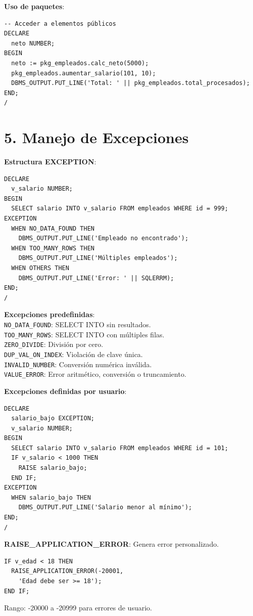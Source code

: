 \documentclass[8pt,a4paper,twocolumn]{article}
\begin{document}
\textbf{Uso de paquetes}:
\begin{lstlisting}
-- Acceder a elementos públicos
DECLARE
  neto NUMBER;
BEGIN
  neto := pkg_empleados.calc_neto(5000);
  pkg_empleados.aumentar_salario(101, 10);
  DBMS_OUTPUT.PUT_LINE('Total: ' || pkg_empleados.total_procesados);
END;
/
\end{lstlisting}

\section*{5. Manejo de Excepciones}

\textbf{Estructura EXCEPTION}:
\begin{lstlisting}
DECLARE
  v_salario NUMBER;
BEGIN
  SELECT salario INTO v_salario FROM empleados WHERE id = 999;
EXCEPTION
  WHEN NO_DATA_FOUND THEN
    DBMS_OUTPUT.PUT_LINE('Empleado no encontrado');
  WHEN TOO_MANY_ROWS THEN
    DBMS_OUTPUT.PUT_LINE('Múltiples empleados');
  WHEN OTHERS THEN
    DBMS_OUTPUT.PUT_LINE('Error: ' || SQLERRM);
END;
/
\end{lstlisting}

\textbf{Excepciones predefinidas}:\\
\texttt{NO\_DATA\_FOUND}: SELECT INTO sin resultados.\\
\texttt{TOO\_MANY\_ROWS}: SELECT INTO con múltiples filas.\\
\texttt{ZERO\_DIVIDE}: División por cero.\\
\texttt{DUP\_VAL\_ON\_INDEX}: Violación de clave única.\\
\texttt{INVALID\_NUMBER}: Conversión numérica inválida.\\
\texttt{VALUE\_ERROR}: Error aritmético, conversión o truncamiento.

\textbf{Excepciones definidas por usuario}:
\begin{lstlisting}
DECLARE
  salario_bajo EXCEPTION;
  v_salario NUMBER;
BEGIN
  SELECT salario INTO v_salario FROM empleados WHERE id = 101;
  IF v_salario < 1000 THEN
    RAISE salario_bajo;
  END IF;
EXCEPTION
  WHEN salario_bajo THEN
    DBMS_OUTPUT.PUT_LINE('Salario menor al mínimo');
END;
/
\end{lstlisting}

\textbf{RAISE\_APPLICATION\_ERROR}: Genera error personalizado.
\begin{lstlisting}
IF v_edad < 18 THEN
  RAISE_APPLICATION_ERROR(-20001, 
    'Edad debe ser >= 18');
END IF;
\end{lstlisting}
Rango: -20000 a -20999 para errores de usuario.
\end{document}
